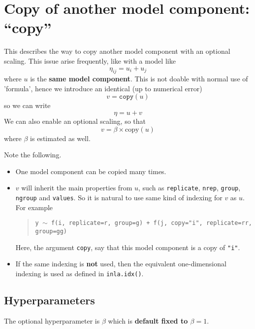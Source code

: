 \documentclass[a4paper,11pt]{article}
\begin{document}
\section*{Copy of another model component: ``copy''}

This describes the way to copy another model component with an
optional scaling. This issue arise frequently, like with a model like
\begin{displaymath}
    \eta_{ij} = u_i + u_j
\end{displaymath}
where $u$ is the \textbf{same model component}. This is not doable
with normal use of 'formula', hence we introduce an identical (up to
numerical error)
\begin{displaymath}
    v = \texttt{copy}(u)
\end{displaymath}
so we can write
\begin{displaymath}
    \eta = u + v
\end{displaymath}
We can also enable an optional scaling, so that
\begin{displaymath}
    v = \beta\times\text{copy}(u)
\end{displaymath}
where $\beta$ is estimated as well.

Note the following.
\begin{itemize}
\item One model component can be copied many times.
\item $v$ will inherit the main properties from $u$, such as
    \texttt{replicate}, \texttt{nrep}, \texttt{group}, \texttt{ngroup}
    and \texttt{values}. So it is natural to use same kind of indexing
    for $v$ as $u$. For example
    \begin{quote}
        \texttt{y $\sim$ f(i, replicate=r, group=g) +
            f(j, copy="i", replicate=rr, group=gg)}
    \end{quote}
    Here, the argument \texttt{copy}, say that this model component
    is a copy of \texttt{"i"}.
\item If the same indexing is \textbf{not} used, then the equivalent
    one-dimensional indexing is used as defined in
    \texttt{inla.idx()}.
\end{itemize}

\subsection*{Hyperparameters}

The optional hyperparameter is $\beta$ which is \textbf{default fixed
    to $\beta=1$}.
\end{document}
